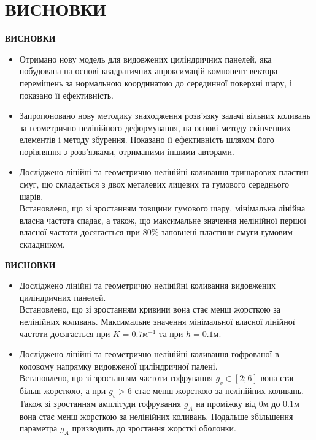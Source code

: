 \documentclass[8pt]{beamer}
\numberwithin{figure}{section}
\numberwithin{equation}{section}
\numberwithin{table}{section}
\begin{document}
\section{ВИСНОВКИ}
\begin{frame}
\textbf{\large ВИСНОВКИ}
\\
\vspace{0.2em}
\begin{itemize}
\item Отримано нову модель для видовжених циліндричних панелей, яка побудована на основі квадратичних апроксимацій компонент вектора переміщень за нормальною координатою до серединної поверхні шару, і показано її ефективність.
\item Запропоновано нову методику знаходження розв’язку задачі вільних коливань за геометрично нелінійного деформування, на основі методу скінченних елементів і методу збурення. Показано її ефективність шляхом його порівняння з розв'язками, отриманими іншими авторами.
\item Досліджено лінійні та геометрично нелінійні коливання тришарових пластин-смуг, що складається з двох металевих лицевих та гумового середнього шарів. \\Встановлено, що зі зростанням товщини гумового шару, мінімальна лінійна власна частота спадає, а також, що максимальне значення нелінійної першої власної частоти досягається при 80\% заповнені пластини смуги гумовим складником.

\end{itemize}
\end{frame}
\begin{frame}
\textbf{\large ВИСНОВКИ}
\\
\vspace{1em}
\begin{itemize}
 
\item Досліджено лінійні та геометрично нелінійні коливання видовжених циліндричних панелей.\\ Встановлено, що зі зростанням кривини вона стає менш жорсткою за нелінійних коливань. Максимальне значення мінімальної власної лінійної частоти досягається при $K=0.7 м^{-1}$ та при $h=0.1 м$.
\item Досліджено лінійні та геометрично нелінійні коливання гофрованої в коловому напрямку видовженої циліндричної палені. \\Встановлено, що зі зростанням частоти гофрування $g_v \in [2;6]$ вона стає більш жорсткою, а при $g_v > 6$ стає менш жорсткою за нелінійних коливань. Також зі зростанням амплітуди гофрування $g_A$ на проміжку від 0м до 0.1м вона стає менш жорсткою за нелінійних коливань. Подальше збільшення параметра $g_A$ призводить до зростання жорсткі оболонки.

\end{itemize}



\end{frame}
\end{document}

